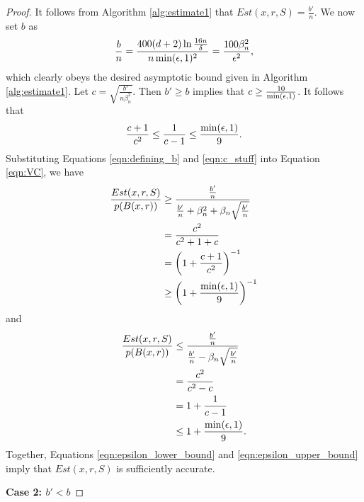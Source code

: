 \begin{proof}
It follows from Algorithm \ref{alg:estimate1} that $Est(x, r, S) = \frac{b'}{n}$. We now set $b$ as  \begin{equation}\label{eqn:defining_b}\frac{b}{n} = \frac{400(d+2)\ln\frac{16n}{\delta}}{n\min(\epsilon, 1)^2} = \frac{100\beta_n^2}{\epsilon^2},\end{equation} which clearly obeys the desired asymptotic bound given in Algorithm \ref{alg:estimate1}. Let $c = \sqrt{\frac{b'}{n\beta_n^2}}$. Then $b' \geq b$ implies that $c \geq \frac{10}{\min(\epsilon, 1)}$. It follows that \begin{equation}\label{eqn:c_stuff}\frac{c+1}{c^2} \leq \frac{1}{c-1} \leq \frac{\min(\epsilon, 1)}{9}.\end{equation} Substituting Equations \ref{eqn:defining_b} and \ref{eqn:c_stuff} into  Equation \ref{eqn:VC}, we have 
\begin{equation}\label{eqn:epsilon_lower_bound}
\begin{split}
\frac{Est(x, r, S)}{p(B(x, r))} &\geq \frac{\frac{b'}{n}}{\frac{b'}{n} + \beta_n^2 + \beta_n \sqrt{\frac{b'}{n}}} \\
&= \frac{c^2}{c^2 + 1 + c} \\
&= \left(1 + \frac{c+1}{c^2} \right)^{-1} \\
&\geq \left(1 + \frac{\min(\epsilon, 1)}{9}\right)^{-1}
\end{split}
\end{equation}
and 
\begin{equation}\label{eqn:epsilon_upper_bound}
\begin{split}
\begin{split}
\frac{Est(x, r, S)}{p(B(x, r))} &\leq \frac{\frac{b'}{n}}{\frac{b'}{n} - \beta_n \sqrt{\frac{b'}{n}}} \\
&= \frac{c^2}{c^2 - c} \\
&= 1 + \frac{1}{c-1} \\
&\leq 1 + \frac{\min(\epsilon, 1)}{9}.
\end{split}
\end{split}
\end{equation}
Together, Equations \ref{eqn:epsilon_lower_bound} and \ref{eqn:epsilon_upper_bound} imply that $Est(x, r, S)$ is sufficiently accurate. 


\textbf{Case 2: $b' < b$ }


\end{proof}
